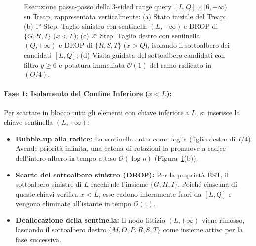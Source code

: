 \begin{figure}[htbp]
{%
}
\caption{Esecuzione passo-passo della 3-sided range query $[L, Q] \times [6, +\infty)$ su Treap, rappresentata verticalmente: (a) Stato iniziale del Treap; (b) 1° Step: Taglio sinistro con sentinella $(L, +\infty)$ e DROP di $\{G, H, I\}$ ($x < L$); (c) 2° Step: Taglio destro con sentinella $(Q, +\infty)$ e DROP di $\{R, S, T\}$ ($x > Q$), isolando il sottoalbero dei candidati $[L, Q]$; (d) Visita guidata del sottoalbero candidati con filtro $y \ge 6$ e potatura immediata $\mathcal{O}(1)$ del ramo radicato in $(O / 4)$.}
\label{fig:3-sided-step-by-step-example}
\end{figure}

\paragraph{Fase 1: Isolamento del Confine Inferiore ($x < L$):}
Per scartare in blocco tutti gli elementi con chiave inferiore a $L$, si inserisce la chiave sentinella $(L, +\infty)$:
\begin{itemize}
    \item \textbf{Bubble-up alla radice:} La sentinella entra come foglia (figlio destro di $I / 4$). Avendo priorit\`a infinita, una catena di rotazioni la promuove a radice dell'intero albero in tempo atteso $\mathcal{O}(\log n)$ (Figura~\ref{fig:3-sided-step-by-step-example}(b)).
    \item \textbf{Scarto del sottoalbero sinistro (DROP):} Per la propriet\`a BST, il sottoalbero sinistro di $L$ racchiude l'insieme $\{G, H, I\}$. Poich\'e ciascuna di queste chiavi verifica $x < L$, esse cadono interamente fuori da $[L, Q]$ e vengono eliminate all'istante in tempo $\mathcal{O}(1)$.
    \item \textbf{Deallocazione della sentinella:} Il nodo fittizio $(L, +\infty)$ viene rimosso, lasciando il sottoalbero destro $\{M, O, P, R, S, T\}$ come insieme attivo per la fase successiva.
\end{itemize}

